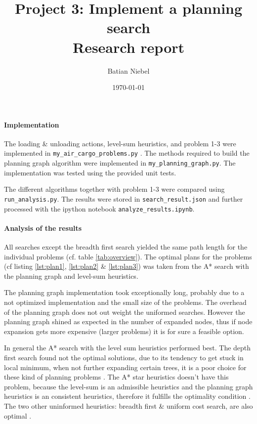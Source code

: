 \documentclass{article}
\begin{document}
\title{Project 3: Implement a planning search  \\ Research report}
\author{Batian Niebel}
\date{\today}
\maketitle

\paragraph*{Implementation}
The loading \& unloading actions, level-sum heuristics, and problem 1-3 were
implemented in \texttt{my\_air\_cargo\_problems.py} . The methods required to
build the planning graph algorithm were implemented in
\texttt{my\_planning\_graph.py}. The implementation was tested using the
provided unit tests.

The different algorithms together with problem 1-3 were compared using
\texttt{run\_analysis.py}. The results were stored in
\texttt{search\_result.json} and further processed with the ipython notebook
\texttt{analyze\_results.ipynb}.

\paragraph*{Analysis of the results}
All searches except the breadth first search yielded the same path length for
the individual problems (cf. table \ref{tab:overview}). The optimal plans for
the problems (cf listing \ref{lst:plan1}, \ref{lst:plan2} \& \ref{lst:plan3}) was taken from
the A* search with the planning graph and level-sum heuristics.

The planning graph implementation took exceptionally long, probably due to a not
optimized implementation and the small size of the problems. The overhead of the
planning graph does not out weight the uniformed searches. However the planning
graph shined as expected in the number of expanded nodes, thus if node
expansion gets more expensive (larger problems) it is for sure a feasible
option.

In general the A* search with the level sum heuristics performed best. The depth first search
found not the optimal solutions, due to its tendency to get stuck in local
minimum, when not further expanding certain trees, it is a poor choice for these
kind of planning problems \cite{russell_92}. The A* star heuristics doesn't have
this problem, because the level-sum is an admissible heuristics and the
planning graph heuristics is an consistent heuristics, therefore it fulfills the
optimality condition \cite{russell_94}. The two other uninformed
heuristics: breadth first \& uniform cost search, are also optimal
\cite{russell_92}.
\end{document}
